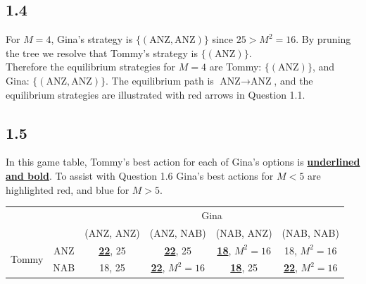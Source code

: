 \documentclass{article}
\begin{document}
\subsection*{1.4}
For $M=4$, Gina's strategy is $\{(\mbox{ANZ}, \mbox{ANZ})\}$ since $25 > M^2 = 16$. By pruning the tree we resolve that Tommy's strategy is $\{(\mbox{ANZ})\}$.\\[2mm]
Therefore the equilibrium strategies for $M=4$ are Tommy: $\{(\mbox{ANZ})\}$, and Gina: $\{(\mbox{ANZ}, \mbox{ANZ})\}$. The equilibrium path is $\mbox{ANZ} \rightarrow \mbox{ANZ}$, and the equilibrium strategies are illustrated with {\color{red}red} arrows in Question 1.1.

\subsection*{1.5} In this game table, Tommy's best action for each of Gina's options is \underline{\textbf{underlined and bold}}. To assist with Question 1.6 Gina's best actions for $M<5$ are highlighted {\color{red}red}, and {\color{blue}blue} for $M>5$.
\begin{table}[H]
    \centering
    \begin{tabular}{cccccc}
                                                    &                          & \multicolumn{4}{c}{Gina}                                                                                                              \\ \cline{3-6} 
                                                    & \multicolumn{1}{c|}{}    & \multicolumn{1}{c|}{(ANZ, ANZ)} & \multicolumn{1}{c|}{(ANZ, NAB)} & \multicolumn{1}{c|}{(NAB, ANZ)} & \multicolumn{1}{c|}{(NAB, NAB)} \\ \cline{2-6} 
        \multicolumn{1}{c|}{\multirow{2}{*}{Tommy}} & \multicolumn{1}{c|}{ANZ} & \multicolumn{1}{c|}{\underline{\textbf{22}}, {\color{red}25}}     & \multicolumn{1}{c|}{\underline{\textbf{22}}, {\color{red}25}}     & \multicolumn{1}{c|}{\underline{\textbf{18}}, {\color{blue}$M^2 = 16$}}  & \multicolumn{1}{c|}{18, {\color{blue}$M^2 = 16$}}  \\ \cline{2-6} 
        \multicolumn{1}{c|}{}                       & \multicolumn{1}{c|}{NAB} & \multicolumn{1}{c|}{18, {\color{red}25}}     & \multicolumn{1}{c|}{\underline{\textbf{22}}, {\color{blue}$M^2 = 16$}}  & \multicolumn{1}{c|}{\underline{\textbf{18}}, {\color{red}25}}     & \multicolumn{1}{c|}{\underline{\textbf{22}}, {\color{blue}$M^2 = 16$}}  \\ \cline{2-6} 
    \end{tabular}
\end{table}
\end{document}
